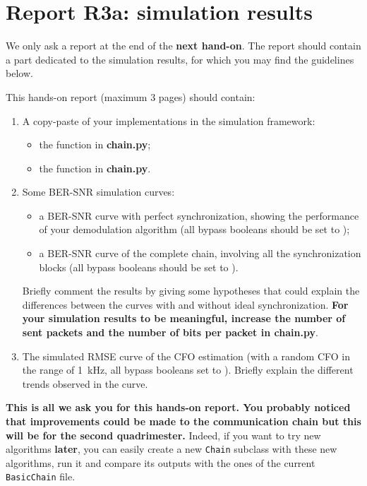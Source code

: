 \section{Report R3a: simulation results}

We only ask a report at the end of the \textbf{next hand-on}. The report should contain a part dedicated to the simulation results, for which you may find the guidelines below.

This hands-on report (maximum 3 pages) should contain:
\begin{enumerate}
    \item A copy-paste of your implementations in the simulation framework:
    \begin{itemize}
        \item the  function in \textbf{chain.py};
        \item the  function in \textbf{chain.py}.
    \end{itemize}
    \item Some BER-SNR simulation curves:
    \begin{itemize}
        \item a BER-SNR curve with perfect synchronization, showing the performance of your demodulation algorithm (all bypass booleans should be set to );
        \item a BER-SNR curve of the complete chain, involving all the synchronization blocks (all bypass booleans should be set to ).
    \end{itemize}
    Briefly comment the results by giving some hypotheses that could explain the differences between the curves with and without ideal synchronization. \textbf{For your simulation results to be meaningful, increase the number of sent packets and the number of bits per packet in \textbf{chain.py}}.
\item The simulated RMSE curve of the CFO estimation (with a random CFO in the range of \SI{1}{\kilo\hertz}, all bypass booleans set to ). Briefly explain the different trends observed in the curve.
\end{enumerate}

\textbf{This is all we ask you for this hands-on report. You probably noticed that improvements could be made to the communication chain but this will be for the second quadrimester.} Indeed, if you want to try new algorithms \textbf{later}, you can easily create a new \texttt{Chain} subclass with these new algorithms, run it and compare its outputs with the ones of the current \texttt{BasicChain} file.


